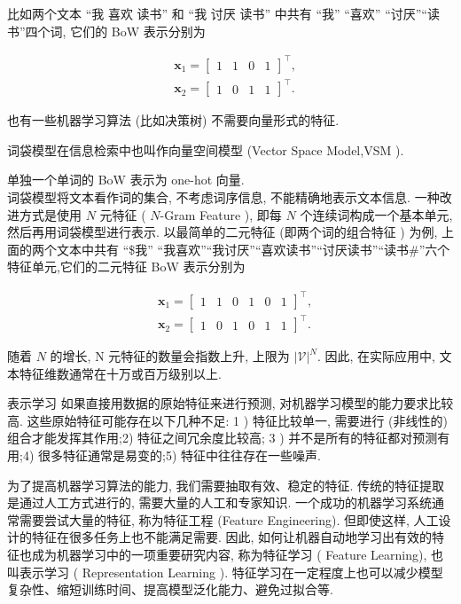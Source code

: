 \documentclass[10pt]{article}
\begin{document}
比如两个文本 “我 喜欢 读书” 和 “我 讨厌 读书” 中共有 “我” “喜欢” “讨厌”“读书”四个词, 它们的 BoW 表示分别为

$$
\begin{aligned}
& \boldsymbol{x}_{1}=\left[\begin{array}{llll}
1 & 1 & 0 & 1
\end{array}\right]^{\top}, \\
& \boldsymbol{x}_{2}=\left[\begin{array}{llll}
1 & 0 & 1 & 1
\end{array}\right]^{\top} .
\end{aligned}
$$

也有一些机器学习算法 (比如决策树) 不需要向量形式的特征.

词袋模型在信息检索中也叫作向量空间模型 (Vector Space Model,VSM ).

单独一个单词的 BoW 表示为 one-hot 向量.\\
词袋模型将文本看作词的集合, 不考虑词序信息, 不能精确地表示文本信息. 一种改进方式是使用 $N$ 元特征 ( $N$-Gram Feature ), 即每 $N$ 个连续词构成一个基本单元, 然后再用词袋模型进行表示. 以最简单的二元特征 (即两个词的组合特征 ) 为例, 上面的两个文本中共有 “\$我” “我喜欢”“我讨厌”“喜欢读书”“讨厌读书”“读书\#”六个特征单元,它们的二元特征 BoW 表示分别为

$$
\begin{aligned}
& \boldsymbol{x}_{1}=\left[\begin{array}{llllll}
1 & 1 & 0 & 1 & 0 & 1
\end{array}\right]^{\top}, \\
& \boldsymbol{x}_{2}=\left[\begin{array}{llllll}
1 & 0 & 1 & 0 & 1 & 1
\end{array}\right]^{\top} .
\end{aligned}
$$

随着 $N$ 的增长, $\mathrm{N}$ 元特征的数量会指数上升, 上限为 $|\mathcal{V}|^{N}$. 因此, 在实际应用中, 文本特征维数通常在十万或百万级别以上.

表示学习 如果直接用数据的原始特征来进行预测, 对机器学习模型的能力要求比较高. 这些原始特征可能存在以下几种不足: 1 ) 特征比较单一, 需要进行 (非线性的) 组合才能发挥其作用;2) 特征之间冗余度比较高; 3 ) 并不是所有的特征都对预测有用;4) 很多特征通常是易变的;5) 特征中往往存在一些噪声.

为了提高机器学习算法的能力, 我们需要抽取有效、稳定的特征. 传统的特征提取是通过人工方式进行的, 需要大量的人工和专家知识. 一个成功的机器学习系统通常需要尝试大量的特征, 称为特征工程 (Feature Engineering). 但即使这样, 人工设计的特征在很多任务上也不能满足需要. 因此, 如何让机器自动地学习出有效的特征也成为机器学习中的一项重要研究内容, 称为特征学习 ( Feature Learning), 也叫表示学习 ( Representation Learning ). 特征学习在一定程度上也可以减少模型复杂性、缩短训练时间、提高模型泛化能力、避免过拟合等.
\end{document}
